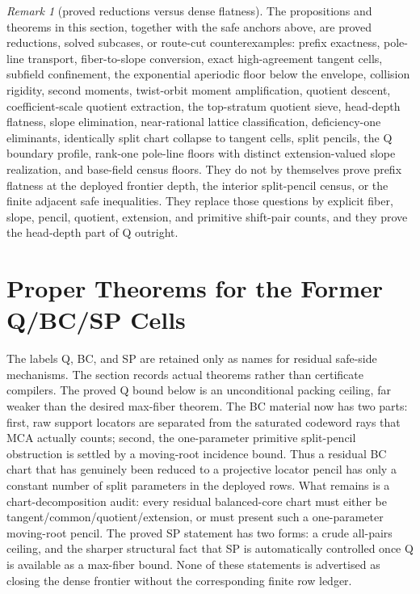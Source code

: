 \documentclass[a4paper,11pt]{amsart}
\theoremstyle{remark}
\newtheorem{remark}[remark]{Remark}
\begin{document}
\begin{remark}[proved reductions versus dense flatness]\label{rem:proved-not-flat}
The propositions and theorems in this section, together with the safe anchors above, are proved reductions, solved subcases, or route-cut counterexamples: prefix exactness, pole-line transport, fiber-to-slope conversion, exact high-agreement tangent cells, subfield confinement, the exponential aperiodic floor below the envelope, collision rigidity, second moments, twist-orbit moment amplification, quotient descent, coefficient-scale quotient extraction, the top-stratum quotient sieve, head-depth flatness, slope elimination, near-rational lattice classification, deficiency-one eliminants, identically split chart collapse to tangent cells, split pencils, the Q boundary profile, rank-one pole-line floors with distinct extension-valued slope realization, and base-field census floors.  They do not by themselves prove prefix flatness at the deployed frontier depth, the interior split-pencil census, or the finite adjacent safe inequalities.  They replace those questions by explicit fiber, slope, pencil, quotient, extension, and primitive shift-pair counts, and they prove the head-depth part of Q outright.
\end{remark}



\section{Proper Theorems for the Former Q/BC/SP Cells}

The labels Q, BC, and SP are retained only as names for residual safe-side mechanisms.  The section records actual theorems rather than certificate compilers.  The proved Q bound below is an unconditional packing ceiling, far weaker than the desired max-fiber theorem.  The BC material now has two parts: first, raw support locators are separated from the saturated codeword rays that MCA actually counts; second, the one-parameter primitive split-pencil obstruction is settled by a moving-root incidence bound.  Thus a residual BC chart that has genuinely been reduced to a projective locator pencil has only a constant number of split parameters in the deployed rows.  What remains is a chart-decomposition audit: every residual balanced-core chart must either be tangent/common/quotient/extension, or must present such a one-parameter moving-root pencil.  The proved SP statement has two forms: a crude all-pairs ceiling, and the sharper structural fact that SP is automatically controlled once Q is available as a max-fiber bound.  None of these statements is advertised as closing the dense frontier without the corresponding finite row ledger.
\end{document}
